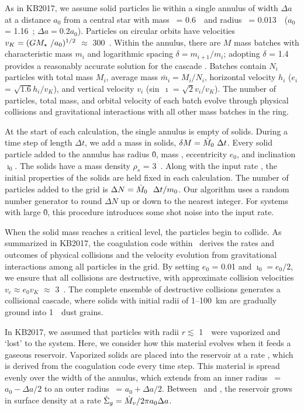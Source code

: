 \documentclass[12pt,preprint]{aastex}
\begin{document}
As in KB2017, we assume solid particles lie within a single annulus of width 
$\Delta a$ at a distance $a_0$ from a central star with mass \mstar\ = 
0.6~\msun\ and radius \rstar\ = 0.013~\rsun\ ($a_0$ = 1.16~\rsun; $\Delta a = 0.2 a_0$).  
Particles on circular orbits have velocities $v_K = (G \mstar\ / a_0)^{1/2}$ 
$\approx$ 300~\kms.  
Within the annulus, there are $M$ mass batches with characteristic mass $m_i$ 
and logarithmic spacing $\delta = m_{i+1} / m_i$; adopting $\delta$ = 1.4 
provides a reasonably accurate solution for the cascade \citep[e.g,][and 
references therein]{kb2015a,kb2015b,kb2016a}.  Batches contain $N_i$ particles 
with total mass $M_i$, average mass $\bar{m}_i = M_i / N_i$, horizontal velocity 
$h_i$ ($e_i$ = $\sqrt{1.6} h_i / v_K$), and vertical velocity $v_i$ 
(sin~$\imath$ = $\sqrt{2} v_i / v_K$).  The number of particles, total mass, 
and orbital velocity of each batch evolve through physical collisions and 
gravitational interactions with all other mass batches in the ring. 

At the start of each calculation, the single annulus is empty of solids. 
During a time step of length $\Delta t$, we add a mass in solids, 
$\delta M = \mdotz\ \Delta t$. Every solid particle added to the annulus
has radius \r0, mass , eccentricity $e_0$, and inclination $\imath_0$.
The solids have a mass density $\rho_s$ = 3~\gcmc.
Along with the input rate \mdotz, the initial properties of the solids are 
held fixed in each calculation.  The number of particles added to the 
grid is $\Delta N = \mdotz\ ~ \Delta t / \m0$. Our algorithm uses a random 
number generator to round $\Delta N$ up or down to the nearest integer.  
For systems with large \r0, this procedure introduces some shot noise into 
the input rate. 

When the solid mass reaches a critical level, the particles begin to collide. 
As summarized in KB2017, the coagulation code within \orch\ derives the rates 
and outcomes of physical collisions and the velocity evolution from gravitational 
interactions among all particles in the grid. By setting $e_0$ = 0.01 and 
$\imath_0 = e_0/2$, we ensure that all collisions are destructive, with approximate 
collision velocities $v_c \approx e_0 v_K$ $\approx$ 3~\kms.  The complete ensemble 
of destructive collisions generates a collisional cascade, where solids with initial 
radii of 1--100~km are gradually ground into 1~\mum\ dust grains.

In KB2017, we assumed that particles with radii $r \lesssim$ 1~\mum\ were
vaporized and `lost' to the system. Here, we consider how this material 
evolves when it feeds a gaseous reservoir. Vaporized solids are placed into 
the reservoir at a rate \mdotv, which is derived from the coagulation code 
every time step.  This material is spread evenly over the width of the annulus, 
which extends from an inner radius \ain\ = $a_0 - \Delta a/2$ to an outer radius 
\aout\ = $a_0 + \Delta a/2$. Between \ain\ and \aout, the reservoir grows in 
surface density at a rate $\dot{\Sigma}_g = \mdotv / 2 \pi a_0 \Delta a$.
\end{document}
